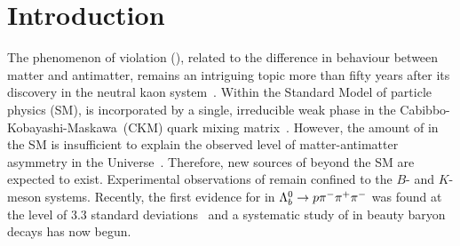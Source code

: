 \section{Introduction}
\label{sec:introduction}

The phenomenon of \CP violation (\CPV), related to the difference in behaviour between matter and antimatter, remains an intriguing topic more than fifty years after its discovery in the neutral kaon system~\cite{PhysRevLett.13.138}. Within the Standard Model of particle physics (SM), \CPV is incorporated by a single, irreducible weak phase in the \mbox{Cabibbo-Kobayashi-Maskawa (CKM)} quark mixing matrix~\cite{1963PhRvL..10..531C,1973PThPh..49..652K}. However, the amount of \CPV in the SM is insufficient to explain the observed level of matter-antimatter asymmetry in the Universe~\cite{1991SvPhU..34..392S,Gavela:1993ts,Gavela:1994dt}. Therefore, new sources of \CPV beyond the SM are expected to exist. Experimental observations of \CPV remain confined to the $B$- and $K$-meson systems. Recently, the first evidence for \CPV in ${{\Lambda}^0_{b}}\rightarrow p\pi^-\pi^+\pi^-$ was found at the level of $3.3$ standard deviations~\cite{LHCb-PAPER-2016-030} and a systematic study of \CPV in beauty baryon decays has now begun.


